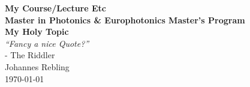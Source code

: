 \documentclass[
a4paper,        			%
DIV=12,
11pt,						%
BCOR=10mm,					%
oneside,					%
headings = normal,			%
listof=totoc,				%
bibliography=totoc,			%
]
{scrartcl}
\begin{document}
\begin{center}
\Large
\textbf{My Course/Lecture Etc\\
Master in Photonics \& Europhotonics Master's Program\\
\vspace{1em}
\huge
My Holy Topic}\\
\vspace{1em}
\Large
\textit{``Fancy a nice Quote?''}\\- The Riddler\\
\vspace{2em}
\Large
Johannes Rebling\\
\vspace{.2em}
\today
\end{center}

\pagestyle{empty}



 
\tableofcontents
\clearpage

\pagestyle{fancy}      %
\setcounter{page}{1}






% 


%
\end{document}
